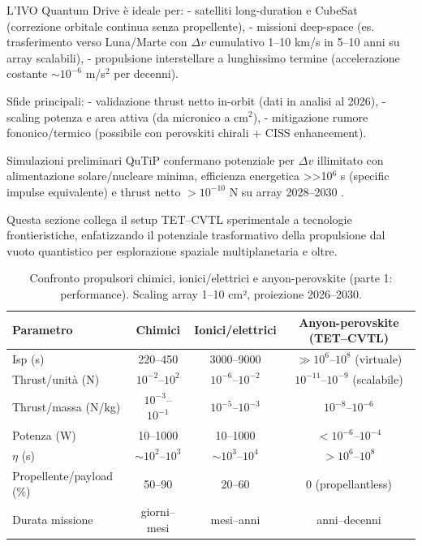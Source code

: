 \documentclass[11pt,a4paper]{article}
\let\oldcite\cite
\renewcommand{\cite}{\protect\oldcite}
\theoremstyle{plain}
\theoremstyle{definition}
\begin{document}
L'IVO Quantum Drive è ideale per:
- satelliti long-duration e CubeSat (correzione orbitale continua senza propellente),
- missioni deep-space (es. trasferimento verso Luna/Marte con $\Delta v$ cumulativo 1–10 km/s in 5–10 anni su array scalabili),
- propulsione interstellare a lunghissimo termine (accelerazione costante $\sim 10^{-6}$ m/s$^2$ per decenni).

Sfide principali:
- validazione thrust netto in-orbit (dati in analisi al 2026),
- scaling potenza e area attiva (da micronico a cm$^2$),
- mitigazione rumore fononico/termico (possibile con perovskiti chirali + CISS enhancement).

Simulazioni preliminari QuTiP confermano potenziale per $\Delta v$ illimitato con alimentazione solare/nucleare minima, efficienza energetica >>10$^6$ s (specific impulse equivalente) e thrust netto $>10^{-10}$ N su array 2028–2030 \cite{forbes2023controversial, dai2026vacuum}.

Questa sezione collega il setup TET--CVTL sperimentale a tecnologie frontieristiche, enfatizzando il potenziale trasformativo della propulsione dal vuoto quantistico per esplorazione spaziale multiplanetaria e oltre.




\begin{table}[H]
\centering
\tiny
\setlength{\tabcolsep}{3pt}
\caption{Confronto propulsori chimici, ionici/elettrici e anyon-perovskite (parte 1: performance). Scaling array 1–10 cm², proiezione 2026–2030.}
\label{tab:propulsione_comparison_a}
\begin{tabular*}{\textwidth}{@{\extracolsep{\fill}} lccc @{\extracolsep{\fill}}}
\toprule
\textbf{Parametro} & \textbf{Chimici} & \textbf{Ionici/elettrici} & \textbf{Anyon-perovskite (TET--CVTL)} \\
\midrule
\rowcolor{lightblue}
Isp (s) & 220--450 & 3000--9000 & $\gg 10^{6}$--$10^{8}$ (virtuale) \\
\midrule
Thrust/unità (N) & $10^{-2}$--$10^{2}$ & $10^{-6}$--$10^{-2}$ & $10^{-11}$--$10^{-9}$ (scalabile) \\
Thrust/massa (N/kg) & $10^{-3}$--$10^{-1}$ & $10^{-5}$--$10^{-3}$ & $10^{-8}$--$10^{-6}$ \\
\rowcolor{lightgreen}
Potenza (W) & 10--1000 & 10--1000 & $<10^{-6}$--$10^{-4}$ \\
$\eta$ (s) & $\sim 10^{2}$--$10^{3}$ & $\sim 10^{3}$--$10^{4}$ & $>10^{6}$--$10^{8}$ \\
\rowcolor{lightgreen}
Propellente/payload (\%) & 50--90 & 20--60 & 0 (propellantless) \\
Durata missione & giorni--mesi & mesi--anni & anni--decenni \\
\bottomrule
\end{tabular*}
\end{table}
\end{document}
